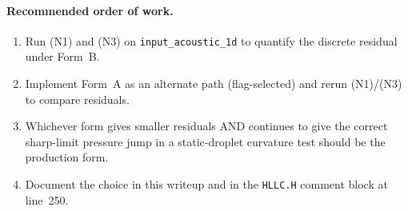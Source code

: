 \documentclass[11pt]{article}
\begin{document}
\paragraph{Recommended order of work.}
\begin{enumerate}
\item Run (N1) and (N3) on \texttt{input\_acoustic\_1d} to quantify the discrete residual under Form~B.
\item Implement Form~A as an alternate path (flag-selected) and rerun (N1)/(N3) to compare residuals.
\item Whichever form gives smaller residuals AND continues to give the correct sharp-limit pressure jump in a static-droplet curvature test should be the production form.
\item Document the choice in this writeup and in the \texttt{HLLC.H} comment block at line~250.
\end{enumerate}
\end{document}
